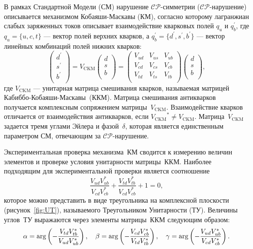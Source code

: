 \documentclass[a4paper,14pt]{extarticle} %
\newcommand{\aphi}{\ensuremath{\alpha}\xspace}
\newcommand{\pphi}{\ensuremath{\beta}\xspace}
\newcommand{\gphi}{\ensuremath{\gamma}\xspace}
\newcommand{\lbr}{\ensuremath{\left(}}
\newcommand{\rbr}{\ensuremath{\right)}}
\newcommand{\vckm}{\ensuremath{V_{\mathrm{CKM}}}\xspace}
\newcommand{\cpconj}{\ensuremath{\mathcal{CP}}\xspace}
\newcommand{\ckm}{\ensuremath{\textrm{ККМ}}\xspace}
\newcommand{\km}{\ensuremath{\textrm{КМ}}\xspace}
\newcommand{\ut}{\ensuremath{\textrm{ТУ}}\xspace}
\begin{document}
В рамках Стандартной Модели (СМ) нарушение \cpconj-симметрии (\cpconj-нарушение) описывается механизмом Кобаяши-Маскавы (\km), согласно которому лагранжиан слабых заряженных токов описывает взаимодействие кварковых полей $q_u$ и $q_b^{\prime}$, где $q_u=\{u, c, t\}$ --- вектор полей верхних кварков, а $q_b^{\prime} = \{d^{\prime}, s^{\prime}, b^{\prime}\}$ --- вектор линейных комбинаций полей нижних кварков:
\begin{equation}\label{eq:ckm}
 \left(
 \begin{array}{c}
   d^{\prime} \\
   s^{\prime} \\
   b^{\prime} \\
  \end{array}
  \right)
  = \vckm
  \left(
  \begin{array}{c}
   d \\ s \\ b \\
  \end{array}
  \right)
  =
  \left(
  \begin{array}{ccc}
   V_{ud} & V_{us} & V_{ub} \\
   V_{cd} & V_{cs} & V_{cb} \\
   V_{td} & V_{ts} & V_{tb} \\
  \end{array}
  \right)\left(
  \begin{array}{c}
   d \\ s \\ b \\
  \end{array}
  \right),
\end{equation}
где $\vckm$ --- унитарная матрица смешивания кварков, называемая матрицей Кабиббо-Кобаяши-Маскавы~(\ckm).  Матрица смешивания антикварков получается комплексным сопряжением матрицы~\vckm.  Взаимодействие кварков отличается от взаимодействия антикварков, если $\vckm^*\neq \vckm$.  Матрица~\vckm задается тремя углами Эйлера и фазой~$\delta$, которая является единственным параметром СМ, отвечающим за \cpconj-нарушение.

Экспериментальная проверка механизма~\km сводится к измерению величин элементов и проверке условия унитарности матрицы~\ckm.  Наиболее подходящим для экспериментальной проверки является соотношение
\begin{equation}\label{eq:ut}
 \frac{V_{ud}V_{ub}^*}{V_{cd}V_{cb}^*}+\frac{V_{td}V_{tb}^*}{V_{cd}V_{cb}^*} + 1 = 0,
\end{equation}
которое можно представить в виде треугольника на комплексной плоскости (рисунок~\ref{fig:UT}), называемого Треугольником Унитарности (\ut). Величины углов~\ut выражаются через элементы матрицы~\ckm следующим образом:
\begin{equation}\label{eq:ut_angles}
 \aphi = \arg\lbr-\frac{V_{td}V^*_{tb}}{V_{ud}V^*_{ub}}\rbr,\quad
 \pphi = \arg\lbr-\frac{V_{cd}V^*_{cb}}{V_{td}V^*_{tb}}\rbr,\quad
 \gphi = \arg\lbr-\frac{V_{ud}V^*_{ub}}{V_{cd}V^*_{cb}}\rbr.
\end{equation}
\end{document}

